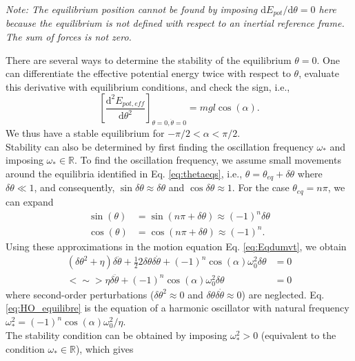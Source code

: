 \documentclass[11pt,a4paper]{exam}
\newcommand{\noteACDH}[1]{\textit{Note: #1}}
\begin{document}
\begin{parts}
    \noteACDH{The equilibrium position cannot be found by imposing $\mathrm d E_{pot}/\mathrm d\theta =0$ here because the equilibrium is not defined with respect to an inertial reference frame. The sum of forces is not zero.}
    \par\vspace{2mm}
    There are several ways to determine the stability of the equilibrium $\theta=0$.
    One can differentiate the effective potential energy twice with respect to $\theta$, evaluate this derivative with equilibrium conditions, and check the sign, i.e.,
    $$
    \left[\frac{\mathrm d^2 E_{pot,eff}}{\mathrm d\theta^2}\right]_{\theta=0,\dot\theta=0} = mgl\cos(\alpha).
    $$
    We thus have a stable equilibrium for $-\pi/2<\alpha<\pi/2$.\\
    Stability can also be determined by first finding the oscillation frequency $\omega_*$ and imposing $\omega_*\in\mathbb{R}$.
    To find the oscillation frequency, we assume small movements around the equilibria identified in Eq. \eqref{eq:thetaeqs}, i.e., $\theta = \theta_{eq} +\delta\theta$ where $\delta\theta \ll 1$, and consequently, $\sin\delta\theta\approx \delta\theta$ and $\cos\delta\theta \approx 1$.
    For the case $\theta_{eq} = n\pi$, we can expand
    \begin{align}
        \sin(\theta) &= \sin(n\pi+\delta\theta) \approx (-1)^n \delta\theta\\
        \cos(\theta) &= \cos(n\pi+\delta\theta) \approx (-1)^n .
    \end{align}
    Using these approximations in the motion equation Eq. \eqref{eq:Eqdumvt}, we obtain
    \begin{align}
    \left(\delta\theta^2+\eta\right)\delta\ddot \theta+ \frac{1}{2}2\delta\theta \delta\dot\theta + (-1)^n \cos(\alpha) \omega_0^2 \delta\theta &=0 \nonumber\\
        <\sim> \eta\delta\ddot\theta +(-1)^n \cos(\alpha)\omega_0^2 \delta\theta   &= 0
        \label{eq:HO_equilibre}
    \end{align}
    where second-order perturbations ($\delta\theta^2\approx 0$ and $\delta\theta\delta\dot\theta\approx 0$) are neglected.
    Eq. \eqref{eq:HO_equilibre} is the equation of a harmonic oscillator with natural frequency $\omega_*^2=(-1)^n \cos(\alpha)\omega_0^2 /\eta$.\\
    The stability condition can be obtained by imposing $\omega_*^2>0$ (equivalent to the condition $\omega_*\in\mathbb{R}$), which gives
    \begin{align}

\end{align}
\end{parts}
\end{document}

